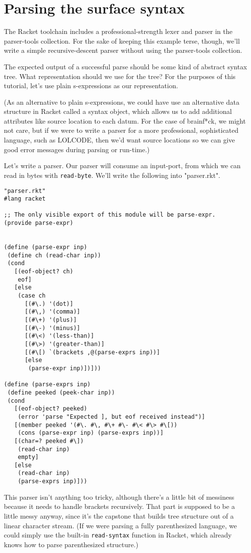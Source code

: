 \documentclass{article}
\begin{document}
\section{Parsing the surface syntax}

The Racket toolchain includes a professional-strength lexer and parser
in the parser-tools collection.  For the sake of keeping this example
terse, though, we'll write a simple recursive-descent parser without
using the parser-tools collection.

The expected output of a successful parse should be some kind of
abstract syntax tree. What representation should we use for the tree?
For the purposes of this tutorial, let's use plain s-expressions as
our representation.

(As an alternative to plain s-expressions, we could have use an
alternative data structure in Racket called a syntax object, which
allows us to add additional attributes like source location to each
datum.  For the case of brainf*ck, we might not care, but if we were
to write a parser for a more professional, sophisticated language,
such as LOLCODE, then we'd want source locations so we can give good
error messages during parsing or run-time.)


Let's write a parser. Our parser will consume an input-port, from
which we can read in bytes with
\verb|read-byte|.  We'll write the following into "parser.rkt".
\begin{verbatim}
"parser.rkt"
#lang racket

;; The only visible export of this module will be parse-expr.
(provide parse-expr)


(define (parse-expr inp)
 (define ch (read-char inp))
 (cond
   [(eof-object? ch)
    eof]
   [else
    (case ch
      [(#\.) '(dot)]
      [(#\,) '(comma)]
      [(#\+) '(plus)]
      [(#\-) '(minus)]
      [(#\<) '(less-than)]
      [(#\>) '(greater-than)]
      [(#\[) `(brackets ,@(parse-exprs inp))]
      [else
       (parse-expr inp)])]))

(define (parse-exprs inp)
 (define peeked (peek-char inp))
 (cond
   [(eof-object? peeked)
    (error 'parse "Expected ], but eof received instead")]
   [(member peeked '(#\. #\, #\+ #\- #\< #\> #\[))
    (cons (parse-expr inp) (parse-exprs inp))]
   [(char=? peeked #\])
    (read-char inp)
    empty]
   [else
    (read-char inp)
    (parse-exprs inp)]))

\end{verbatim}

This parser isn't anything too tricky, although there's a little bit
of messiness because it needs to handle brackets recursively. That
part is supposed to be a little messy anyway, since it's the capstone
that builds tree structure out of a linear character stream.  (If we
were parsing a fully parenthesized language, we could simply use the
built-in \verb|read-syntax| function in Racket, which already knows
how to parse parenthesized structure.)
\end{document}
